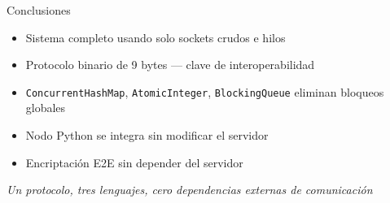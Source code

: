 \documentclass[aspectratio=169,14pt]{beamer}
\begin{document}
\begin{frame}{Conclusiones}
\begin{itemize}
  \item Sistema completo usando solo sockets crudos e hilos
  \item Protocolo binario de 9 bytes --- clave de interoperabilidad
  \item \texttt{ConcurrentHashMap}, \texttt{AtomicInteger}, \texttt{BlockingQueue}
        eliminan bloqueos globales
  \item Nodo Python se integra sin modificar el servidor
  \item Encriptación E2E sin depender del servidor
\end{itemize}

\vfill
\centering
\emph{Un protocolo, tres lenguajes, cero dependencias externas de comunicación}
\end{frame}
\end{document}

